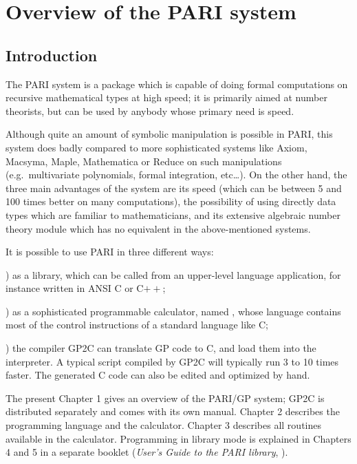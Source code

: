 %
%
\chapter{Overview of the PARI system}

\section{Introduction}

\noindent
The PARI system is a package which is capable of doing formal computations
on recursive mathematical types at high speed; it is primarily aimed at
number theorists, but can be used by anybody whose primary need is speed.

Although quite an amount of symbolic manipulation is possible in PARI, this
system does badly compared to more sophisticated systems like Axiom, Macsyma,
Maple, Mathematica or Reduce on such manipulations (e.g.~multivariate
polynomials, formal integration, etc\dots). On the other hand, the three main
advantages of the system are its speed (which can be between 5 and 100 times
better on many computations), the possibility of using directly data types
which are familiar to mathematicians, and its extensive algebraic number
theory module which has no equivalent in the above-mentioned systems.

It is possible to use PARI in three different ways:

) as a library, which can be called from an upper-level language
application, for instance written in ANSI C or C$++$;

) as a sophisticated programmable calculator, named , whose
language  contains most of the control instructions of a standard
language like C;

) the compiler GP2C can translate GP code to C, and load them into the
 interpreter. A typical script compiled by GP2C will typically run 3
to 10 times faster. The generated C code can also be edited and optimized by
hand.

The present Chapter 1 gives an overview of the PARI/GP system; GP2C is
distributed separately and comes with its own manual. Chapter 2 describes the
 programming language and the  calculator. Chapter 3
describes all routines available in the calculator. Programming in library
mode is explained in Chapters 4 and 5 in a separate booklet (\emph{User's
Guide to the PARI library}, ).

